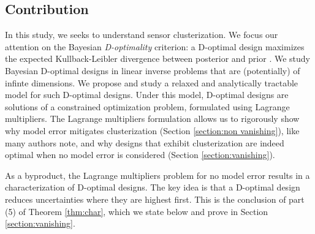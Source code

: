 \subsection{Contribution}
In this study, we seeks to understand sensor clusterization. We focus
our attention on the Bayesian \emph{D-optimality} criterion: a
D-optimal design maximizes the expected Kullback-Leibler divergence
\cite{CoverThomas91} between posterior and prior
\cite{Chaloner1995}. We study Bayesian D-optimal designs in linear
inverse problems that are (potentially) of infinte dimensions. We
propose and study a relaxed and analytically tractable model for such
D-optimal designs. Under this model, D-optimal designs are solutions
of a constrained optimization problem, formulated using Lagrange
multipliers. The Lagrange multipliers formulation allows us to
rigorously show why model error mitigates clusterization (Section
\ref{section:non vanishing}), like many authors note, and why designs
that exhibit clusterization are indeed optimal when no model error is
considered (Section \ref{section:vanishing}).

As a byproduct, the Lagrange multipliers problem for no model error
results in a characterization of D-optimal designs. The key idea is
that a D-optimal design reduces uncertainties where they are highest
first. This is the conclusion of part (5) of Theorem \ref{thm:char},
which we state below and prove in Section \ref{section:vanishing}.

